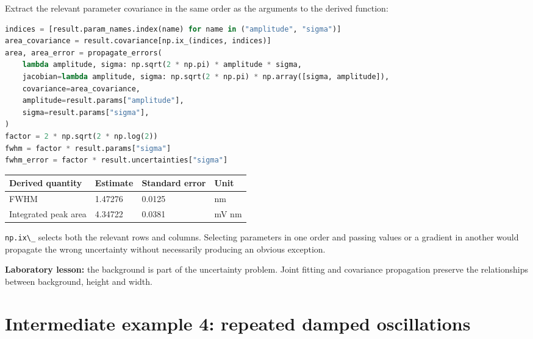 \documentclass[
  british,
  10pt,
  a4paper,
]{article}
\newcommand{\passthrough}[1]{#1}
\begin{document}
Extract the relevant parameter covariance in the same order as the
arguments to the derived function:

\par\noindent\begin{minipage}{\linewidth}

\begin{lstlisting}[language=Python]
indices = [result.param_names.index(name) for name in ("amplitude", "sigma")]
area_covariance = result.covariance[np.ix_(indices, indices)]
area, area_error = propagate_errors(
    lambda amplitude, sigma: np.sqrt(2 * np.pi) * amplitude * sigma,
    jacobian=lambda amplitude, sigma: np.sqrt(2 * np.pi) * np.array([sigma, amplitude]),
    covariance=area_covariance,
    amplitude=result.params["amplitude"],
    sigma=result.params["sigma"],
)
factor = 2 * np.sqrt(2 * np.log(2))
fwhm = factor * result.params["sigma"]
fwhm_error = factor * result.uncertainties["sigma"]
\end{lstlisting}

\end{minipage}\par

\begin{longtable}[]{@{}llll@{}}
\toprule\noalign{}
Derived quantity & Estimate & Standard error & Unit \\
\midrule\noalign{}
\endhead
\bottomrule\noalign{}
\endlastfoot
FWHM & 1.47276 & 0.0125 & nm \\
Integrated peak area & 4.34722 & 0.0381 & mV nm \\
\end{longtable}

\passthrough{\lstinline!np.ix\_!} selects both the relevant rows and
columns. Selecting parameters in one order and passing values or a
gradient in another would propagate the wrong uncertainty without
necessarily producing an obvious exception.

\textbf{Laboratory lesson:} the background is part of the uncertainty
problem. Joint fitting and covariance propagation preserve the
relationships between background, height and width.

\clearpage

\section{Intermediate example 4: repeated damped
oscillations}\label{intermediate-example-4-repeated-damped-oscillations}

\end{document}
